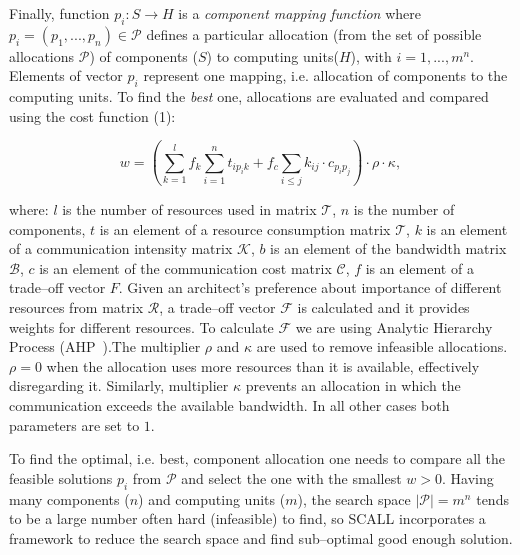 \documentclass{sig-alternate}
\begin{document}
Finally, function  $p_i:S \to H$ is a \textsl{component mapping function} where $p_i=(p_1,...,p_n) \in  \mathcal{P}$ defines a particular allocation (from the set of possible allocations $\mathcal{P}$)  of components ($S$) to computing units($H$), with $i=1,...,m^n$. Elements of vector $p_i$ represent one mapping, i.e. allocation of components to the computing units. To find the \textsl{best} one, allocations are evaluated and compared using the cost function (1):

\vspace{-9mm}
\begin{center}
	\begin{large}
		\begin{equation}
		\label{eq:costfunction}
		w = \left(\sum\limits_{k=1}^l f_k  \sum\limits_{i=1}^n t_{i p_i k} + f_c \sum\limits_{i\leq j}k_{ij} \cdot c_{p_i p_j} \right) \cdot \rho \cdot \kappa ,
		\end{equation}  
	\end{large}
\end{center}

\vspace{-2mm}

\noindent where: 
$l$ is the number of resources used in matrix $\mathcal{T}$, 
$n$ is the number of components, 
$t$ is an element of a resource consumption matrix $\mathcal{T}$, 
$k$ is an element of a communication intensity matrix $\mathcal{K}$,
$b$ is an element of the bandwidth matrix $\mathcal{B}$,
$c$ is an element of the communication cost matrix $\mathcal{C}$,
$f$ is an element of a trade--off vector $F$.  
Given an architect's preference about importance of different resources from matrix $\mathcal{R}$, a trade--off vector $\mathcal{F}$ is calculated and it provides weights for different resources. To calculate $\mathcal{F}$ we are using Analytic Hierarchy Process (AHP~\cite{saaty1994fundamentals}).The multiplier $\rho$ and $\kappa$ are used to remove infeasible allocations. $\rho=0$ when the allocation uses more resources than it is available, effectively disregarding it. Similarly, multiplier $\kappa$ prevents an allocation in which the communication exceeds the available bandwidth. In all other cases both parameters are set to $1$. 

\noindent To find the optimal, i.e. best, component allocation one needs to compare all the feasible solutions $p_i$ from $\mathcal{P}$ and select the one with the smallest $w > 0$. Having many components ($n$) and computing units ($m$), the search space $|\mathcal{P}|=m^n$ tends to be a large number often hard (infeasible) to find, so SCALL incorporates a framework to reduce the search space and find sub--optimal good enough solution. 
\end{document}
